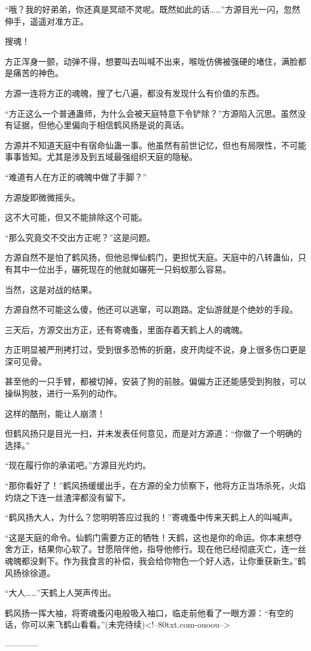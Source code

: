 \begin{this_body}
“哦？我的好弟弟，你还真是冥顽不灵呢。既然如此的话……”方源目光一闪，忽然伸手，遥遥对准方正。

搜魂！

方正浑身一颤，动弹不得，想要叫去叫喊不出来，喉咙仿佛被强硬的堵住，满脸都是痛苦的神色。

方源一连将方正的魂魄，搜了七八遍，都没有发现什么有价值的东西。

“方正这么一个普通蛊师，为什么会被天庭特意下令铲除？”方源陷入沉思。虽然没有证据，但他心里偏向于相信鹤风扬是说的真话。

方源并不知道天庭中有宿命仙蛊一事。他虽然有前世记忆，但也有局限性，不可能事事皆知。尤其是涉及到五域最强组织天庭的隐秘。

“难道有人在方正的魂魄中做了手脚？”

方源旋即微微摇头。

这不大可能，但又不能排除这个可能。

“那么究竟交不交出方正呢？”这是问题。

方源自然不是怕了鹤风扬，但他忌惮仙鹤门，更担忧天庭。天庭中的八转蛊仙，只有其中一位出手，碾死现在的他就如碾死一只蚂蚁那么容易。

当然，这是对战的结果。

方源自然不可能这么傻，他还可以逃窜，可以跑路。定仙游就是个绝妙的手段。

三天后，方源交出方正，还有寄魂蚤，里面存着天鹤上人的魂魄。

方正明显被严刑拷打过，受到很多恐怖的折磨，皮开肉绽不说，身上很多伤口更是深可见骨。

甚至他的一只手臂，都被切掉，安装了狗的前肢。偏偏方正还能感受到狗肢，可以操纵狗肢，进行一系列的动作。

这样的酷刑，能让人崩溃！

但鹤风扬只是目光一扫，并未发表任何意见，而是对方源道：“你做了一个明确的选择。”

“现在履行你的承诺吧。”方源目光灼灼。

“那你看好了！”鹤风扬缓缓出手，在方源的全力侦察下，他将方正当场杀死，火焰灼烧之下连一丝渣滓都没有留下。

“鹤风扬大人，为什么？您明明答应过我的！”寄魂蚤中传来天鹤上人的叫喊声。

“这是天庭的命令。仙鹤门需要方正的牺牲！天鹤，这也是你的命运。你本来想夺舍方正，结果你心软了。甘愿陪伴他，指导他修行。现在他已经彻底灭亡，连一丝魂魄都没剩下。作为我食言的补偿，我会给你物色一个好人选，让你重获新生。”鹤风扬徐徐道。

“大人……”天鹤上人哭声传出。

鹤风扬一挥大袖，将寄魂蚤闪电般吸入袖口，临走前他看了一眼方源：“有空的话，你可以来飞鹤山看看。”(未完待续)<!--80txt.com-ouoou-->

------------

\end{this_body}

